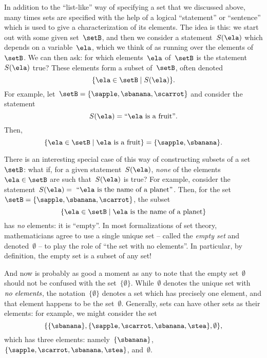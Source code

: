 In addition to the ``list-like'' way of specifying a set that we discussed above, many times sets are specified with the help of a logical ``statement'' or ``sentence'' which is used to give a characterization of its elements.
The idea is this: we start out with some given set~$\setB$, and then we consider a statement~$S(\ela)$ which depends on a variable~$\ela$, which we think of as running over the elements of~$\setB$.
We can then ask: for which elements~$\ela$ of~$\setB$ is the statement~$S(\ela)$ true?
These elements form a subset of~$\setB$, often denoted
\begin{equation}
    \label{eq:axiom-specialization}
    \{ \ela \in \setB \mid S(\ela) \}.
\end{equation}
For example, let~$\setB = \{ \sapple, \sbanana, \scarrot \}$ and consider the statement
\begin{equation*}
    S(\ela) = \text{``} \ela \text{ is a fruit''}.
\end{equation*}
Then,
\begin{equation*}
    \{ \ela \in \setB \mid \ela \text{ is a fruit} \} = \{ \sapple, \sbanana \}.
\end{equation*}

There is an interesting special case of this way of constructing subsets of a set~$\setB$:
what if, for a given statement~$S(\ela)$, \emph{none} of the elements~$\ela \in \setB$ are such that~$S(\ela)$ is true?
For example, consider the statement~$S(\ela) =\text{ ``} \ela \text{ is the name of a planet''}$.
Then, for the set~$\setB = \{ \sapple, \sbanana, \scarrot \}$, the subset
\begin{equation*}
    \{ \ela \in \setB \mid \ela \text{ is the name of a planet} \}
\end{equation*}
has \emph{no} elements: it is ``empty''.
In most formalizations of set theory, mathematicians agree to use a single unique set -- called the \emph{empty set} and denoted~$\emptyset$ -- to play the role of ``the set with no elements''.
In particular, by definition, the empty set is a subset of any set!

And now is probably as good a moment as any to note that the empty set~$\emptyset$ should not be confused with the set~$\{ \emptyset \}$.
While~$\emptyset$ denotes the unique set with~$\emph{no elements}$, the notation~$\{ \emptyset \}$ denotes a set which has precisely one element, and that element happens to be the set~$\emptyset$.
Generally, sets can have other sets as their elements: for example, we might consider the set
\begin{equation*}
    \{ \{ \sbanana \}, \{ \sapple, \scarrot, \sbanana, \stea \}, \emptyset \},
\end{equation*}
which has three elements: namely~$\{ \sbanana \}$,~$\{ \sapple, \scarrot, \sbanana, \stea \}$, and~$\emptyset$.


